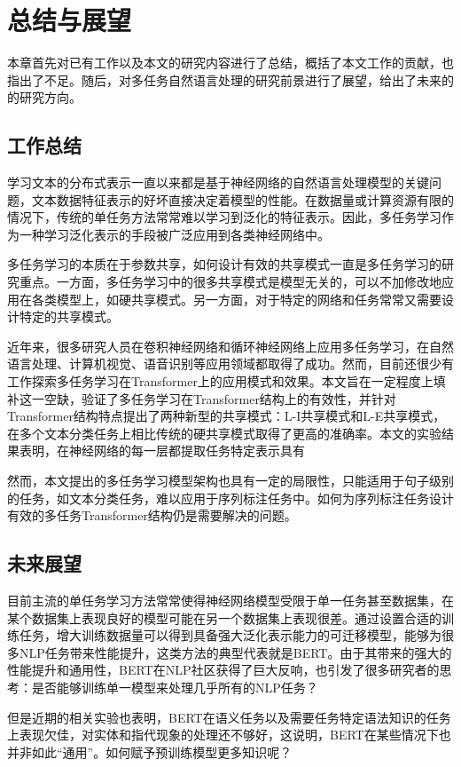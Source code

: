 \chapter{总结与展望}
\label{cha:conclusions}
本章首先对已有工作以及本文的研究内容进行了总结，概括了本文工作的贡献，也指出了不足。随后，对多任务自然语言处理的研究前景进行了展望，给出了未来的的研究方向。

\section{工作总结}
学习文本的分布式表示一直以来都是基于神经网络的自然语言处理模型的关键问题，文本数据特征表示的好坏直接决定着模型的性能。在数据量或计算资源有限的情况下，传统的单任务方法常常难以学习到泛化的特征表示。因此，多任务学习作为一种学习泛化表示的手段被广泛应用到各类神经网络中。

多任务学习的本质在于参数共享，如何设计有效的共享模式一直是多任务学习的研究重点。一方面，多任务学习中的很多共享模式是模型无关的，可以不加修改地应用在各类模型上，如硬共享模式。另一方面，对于特定的网络和任务常常又需要设计特定的共享模式。

近年来，很多研究人员在卷积神经网络和循环神经网络上应用多任务学习，在自然语言处理、计算机视觉、语音识别等应用领域都取得了成功。然而，目前还很少有工作探索多任务学习在Transformer上的应用模式和效果。本文旨在一定程度上填补这一空缺，验证了多任务学习在Transformer结构上的有效性，并针对Transformer结构特点提出了两种新型的共享模式：L-I共享模式和L-E共享模式，在多个文本分类任务上相比传统的硬共享模式取得了更高的准确率。本文的实验结果表明，在神经网络的每一层都提取任务特定表示具有

然而，本文提出的多任务学习模型架构也具有一定的局限性，只能适用于句子级别的任务，如文本分类任务，难以应用于序列标注任务中。如何为序列标注任务设计有效的多任务Transformer结构仍是需要解决的问题。

\section{未来展望}
目前主流的单任务学习方法常常使得神经网络模型受限于单一任务甚至数据集，在某个数据集上表现良好的模型可能在另一个数据集上表现很差。通过设置合适的训练任务，增大训练数据量可以得到具备强大泛化表示能力的可迁移模型，能够为很多NLP任务带来性能提升，这类方法的典型代表就是BERT。由于其带来的强大的性能提升和通用性，BERT在NLP社区获得了巨大反响，也引发了很多研究者的思考：是否能够训练单一模型来处理几乎所有的NLP任务？

但是近期的相关实验也表明，BERT在语义任务以及需要任务特定语法知识的任务上表现欠佳，对实体和指代现象的处理还不够好\cite{47786}\cite{liu2019linguistic}，这说明，BERT在某些情况下也并非如此“通用”。如何赋予预训练模型更多知识呢？


